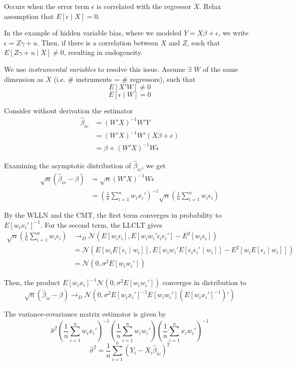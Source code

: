 \documentclass[16pt]{article}
\newcommand{\bh}{\hat{\beta}}
\newcommand{\norm}{\mathcal{N}}
\newcommand{\sh}{\hat{\sigma}^2}
\begin{document}
Occurs when the error term $\epsilon$ is correlated with the regressor $X$. Relax assumption that $E[\epsilon\mid X] = 0$. 

In the example of hidden variable bias, where we modeled $Y = X\beta + \epsilon$, we write $\epsilon = Z \gamma + u$. Then, if there is a correlation between $X$ and $Z$, such that $E[Z\gamma + u \mid X] \neq 0$, resulting in endogeneity.

We use \emph{instrumental variables} to resolve this issue. Assume $\exists$ $W$ of the same dimension as $X$ (i.e. \# instruments = \# regressors), such that $$E[X'W] \neq 0$$$$E[\epsilon\mid W] = 0$$

Consider without derivation the estimator \begin{align*}
  \bh_{iv} &= (W'X)^{-1}W'Y\\
           &= (W'X)^{-1} W'(X\beta + \epsilon)\\
           &= \beta + (W'X)^{-1}W\epsilon
\end{align*}

Examining the asymptotic distribution of $\bh_{iv}$, we get
\begin{align*}
  \sqrt{n}(\bh_{iv} - \beta) &= \sqrt{n}(W'X)^{-1}W\epsilon\\
    &= (\frac{1}{n} \sum_{i=1}^n w_i x_i')^{-1}\sqrt{n}(\frac{1}{n} \sum_{i=1}^n w_i \epsilon_i)
\end{align*}

By the WLLN and the CMT, the first term converges in probability to $E[w_i x_i']^{-1}$. For the second term, the LLCLT gives 
\begin{align*}
\sqrt{n}(\frac{1}{n} \sum_{i=1}^n w_i \epsilon_i) &\to_D \norm(E[w_i \epsilon_i], E[w_i w_i' \epsilon_i \epsilon_i'] - E^2[w_i \epsilon_i])\\
  &= \norm(E[w_i E[\epsilon_i \mid w_i]], E[w_i w_i' E[\epsilon_i \epsilon_i' \mid w_i]] - E^2[w_i E[\epsilon_i \mid w_i]])\\
  &= \norm(0, \sigma^2 E[w_i w_i'])
\end{align*}

Then, the product $E[w_i x_i]^{-1} \norm(0, \sigma^2 E[w_i w_i'])$ converges in distribution to $$\sqrt{n}(\bh_{iv} - \beta) \to_D \norm(0, \sigma^2 E[w_i x_i']^{-1} E[w_i w_i'] (E[w_i x_i']^{-1})')$$

The variance-covariance matrix estimator is given by $$\sh (\frac{1}{n} \sum_{i=1}^n w_i x_i')^{-1} (\frac{1}{n} \sum_{i=1}^n w_i w_i') (\frac{1}{n} \sum_{i=1}^n x_i w_i')^{-1}$$
$$\sh = \frac{1}{n} \sum_{i=1}^n (Y_i - X_i \bh_{iv})^2$$
\end{document}
